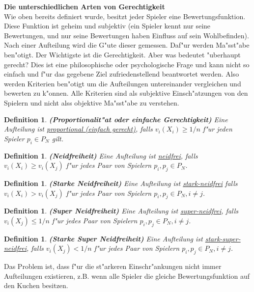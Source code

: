 \documentclass[11pt, a4paper, twoside]{article}
\newtheorem{defi}[satz]{Definition}
\numberwithin{equation}{section}
\begin{document}
\newline
\textbf{Die unterschiedlichen Arten von Gerechtigkeit}\\
\newline
Wie oben bereits definiert wurde, besitzt jeder Spieler eine Bewertungsfunktion. Diese Funktion ist geheim und subjektiv (ein Spieler kennt nur seine Bewertungen, und nur seine Bewertungen haben Einfluss auf sein Wohlbefinden). Nach einer Aufteilung wird die G"ute dieser gemessen. Daf"ur werden Ma"sst"abe ben"otigt. Der Wichtigste ist die Gerechtigkeit. Aber was bedeutet "uberhaupt gerecht? Dies ist eine philosophische oder psychologische Frage und kann nicht so einfach und f"ur das gegebene Ziel zufriedenstellend beantwortet werden. Also werden Kriterien ben"otigt um die Aufteilungen untereinander vergleichen und bewerten zu k"onnen. Alle Kriterien sind als subjektive Einsch"atzungen von den Spielern und nicht alss objektive Ma"sst"abe zu verstehen. 
\begin{defi}{\textbf{(Proportionalit"at oder einfache Gerechtigkeit)}}
\newline Eine Aufteilung ist \underline{proportional (einfach gerecht)}, falls  $v_i(X_i) \geq 1/n$ f"ur jeden Spieler $p_i \in P_N$ gilt. 
\end{defi} 
\begin{defi}{\textbf{(Neidfreiheit)}}
\newline Eine Aufteilung ist \underline{neidfrei}, falls $v_i(X_i) \geq v_i(X_j)$ f"ur jedes Paar von Spielern $p_i, p_j \in P_N$. 
\end{defi}
\begin{defi}{\textbf{(Starke Neidfreiheit)}}
\newline  Eine Aufteilung ist \underline{stark-neidfrei} falls $v_i(X_i) > v_i(X_j)$ f"ur jedes Paar von Spielern $p_i, p_j \in P_N, i \neq j$.  
\end{defi} 
\begin{defi}{\textbf{(Super Neidfreiheit)}}
\newline Eine Aufteilung ist \underline{super-neidfrei}, falls $v_i(X_j) \leq 1/n$  f"ur jedes Paar von Spielern $p_i, p_j \in P_N, i \neq j$. 
\end{defi} 
\begin{defi}{\textbf{(Starke Super Neidfreiheit)}}
\newline Eine Aufteilung ist \underline{stark-super-neidfrei}, falls $v_i(X_j) < 1/n$  f"ur jedes Paar von Spielern $p_i, p_j \in P_N, i \neq j$. 
\end{defi} 
Das Problem ist, dass f"ur die st"arkeren Einschr"ankungen nicht immer Aufteilungen existieren, z.B. wenn alle Spieler die gleiche Bewertungsfunktion auf den Kuchen besitzen. 
\end{document}
